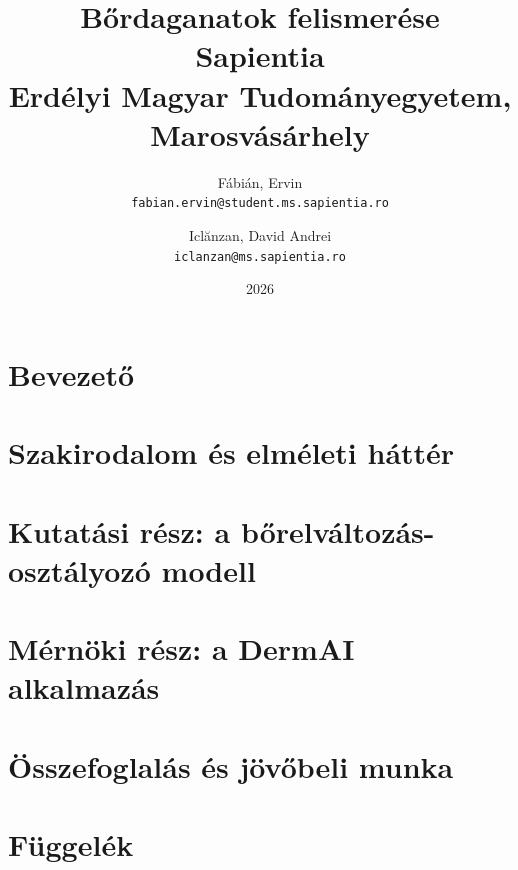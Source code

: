 \documentclass[12pt, twosides]{report}
\title{
	{Bőrdaganatok felismerése}\\
	{\large Sapientia\\
	Erdélyi Magyar Tudományegyetem, Marosvásárhely}
}
\author{
	Fábián, Ervin\\
	\texttt{fabian.ervin@student.ms.sapientia.ro}
	\and
	Iclănzan, David Andrei\\
	\texttt{iclanzan@ms.sapientia.ro}	
}
\date{2026}
\begin{document}
%

%

%

%

%


\tableofcontents

\listoffigures

\chapter{Bevezető}


\chapter{Szakirodalom és elméleti háttér}


\chapter{Kutatási rész: a bőrelváltozás-osztályozó modell} \label{chpt:research}


\chapter{Mérnöki rész: a DermAI alkalmazás} \label{chpt:engineering}


\chapter{Összefoglalás és jövőbeli munka}





\appendix
\chapter{Függelék}

\end{document}
